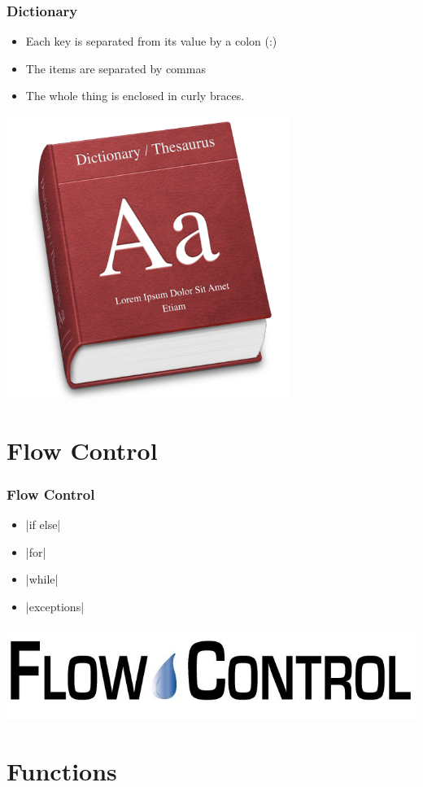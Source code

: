 \documentclass{../py-lecture}
\begin{document}
\begin{frame}
	\frametitle{Dictionary}
  \begin{itemize}
    \item Each key is separated from its value by a colon (:)
    \item The items are separated by commas
    \item The whole thing is enclosed in curly braces.
  \end{itemize}
	\centering\includegraphics[width=.4\textwidth]{img/dictionary.jpg}
\end{frame}

\section{Flow Control}

\begin{frame}
	\frametitle{Flow Control}
  \begin{itemize}
    \item {}|if else|
    \item {}|for|
    \item {}|while|
    \item {}|exceptions|
  \end{itemize}
	\centering\includegraphics[width=.4\textwidth]{img/flow-control.jpg}
\end{frame}

\section{Functions}
\end{document}
